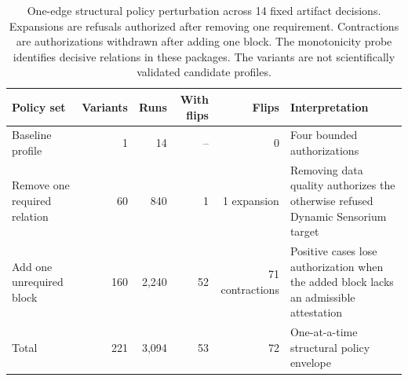 \begin{table}[!htbp]
\centering
\caption{One-edge structural policy perturbation across 14 fixed artifact decisions. Expansions are refusals authorized after removing one requirement. Contractions are authorizations withdrawn after adding one block. The monotonicity probe identifies decisive relations in these packages. The variants are not scientifically validated candidate profiles.}
\label{tab:profile-sensitivity-v2}
\scriptsize
\renewcommand{\arraystretch}{1.00}
\begin{tabularx}{\textwidth}{@{}P{0.18\textwidth}rrrrY@{}}
\toprule
Policy set & Variants & Runs & With flips & Flips & Interpretation \\
\midrule
Baseline profile & 1 & 14 & -- & 0 & Four bounded authorizations \\
Remove one required relation & 60 & 840 & 1 & 1 expansion & Removing data quality authorizes the otherwise refused Dynamic Sensorium target \\
Add one unrequired block & 160 & 2,240 & 52 & 71 contractions & Positive cases lose authorization when the added block lacks an admissible attestation \\
\midrule
Total & 221 & 3,094 & 53 & 72 & One-at-a-time structural policy envelope \\
\bottomrule
\end{tabularx}
\end{table}
